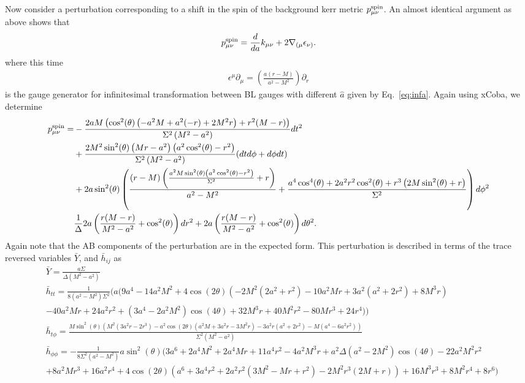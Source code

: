 \documentclass[aps,prd,amsmath,showpacs,amssymb,superscriptaddress,nofootinbib,longbibliography,eqsecnum,preprintnumbers]{revtex4-1}
\begin{document}
Now consider a perturbation corresponding to a shift in the spin of the background kerr metric $p_{\mu\nu}^{\rm spin}$. An almost identical argument as above shows that 
\begin{align}
p_{\mu\nu}^{\rm spin}=\frac{d}{da}k_{\mu\nu}+2\nabla_{(\mu}\epsilon_{\nu)}.
\end{align}
where this time 
\begin{align}
\epsilon^\mu\partial_\mu=\left(\frac{a(r-M)}{a^2-M^2}\right)\partial_r
\end{align}
is the gauge generator for infinitesimal transformation between BL gauges with different $\hat a$ given by Eq.~\eqref{eq:infa}. Again using xCoba, we determine
\begin{align}
p_{\mu\nu}^{\rm spin}= 
&-\frac{2 a M \left(\cos ^2(\theta ) \left(-a^2 M+a^2 (-r)+2 M^2 r\right)+r^2 (M-r)\right)}{\Sigma ^2 \left(M^2-a^2\right)} dt^2 \nonumber \\
&+\frac{2 M^2 \sin ^2(\theta ) \left(M r-a^2\right) \left(a^2 \cos ^2(\theta )-r^2\right)}{\Sigma ^2 \left(M^2-a^2\right)}(dt d\phi+d\phi dt) \nonumber \\
&+2 a \sin ^2(\theta ) \left(\frac{(r-M) \left(\frac{a^2 M \sin ^2(\theta ) \left(a^2 \cos ^2(\theta )-r^2\right)}{\Sigma ^2}+r\right)}{a^2-M^2}+\frac{a^4 \cos ^4(\theta )+2 a^2 r^2 \cos ^2(\theta )+r^3 \left(2 M \sin ^2(\theta )+r\right)}{\Sigma ^2}\right) d\phi^2 \nonumber \\
&\frac{1}{\Delta}2 a \left(\frac{r (M-r)}{M^2-a^2}+\cos ^2(\theta )\right)dr^2+ 2 a \left(\frac{r (M-r)}{M^2-a^2}+\cos ^2(\theta )\right)d\theta^2.
\end{align}
Again note that the AB components of the perturbation are in the expected form. This perturbation is described in terms of the trace reversed variables $\bar Y$, and $\bar h_{ij}$ as
\begin{align}
&\bar Y =\frac{a\Sigma}{\Delta(M^2-a^2)} \nonumber \\
&\bar h_{tt}=\frac{1}{8 (a^2 - M^2)\Sigma^2}(a (9 a^4-14 a^2 M^2+4 \cos (2 \theta ) \left(-2 M^2 \left(2 a^2+r^2\right)-10 a^2 M r+3 a^2 \left(a^2+2 r^2\right)+8 M^3 r\right)
\nonumber \\
&-40 a^2 M r+24 a^2 r^2+\left(3 a^4-2 a^2 M^2\right) \cos (4 \theta )+32 M^3 r+40 M^2 r^2-80 M r^3+24 r^4)) \nonumber \\
&\bar h_{t\phi}=\frac{M \sin ^2(\theta ) \left(M^2 \left(3 a^2 r-2 r^3\right)-a^2 \cos (2 \theta ) \left(a^2 M+3 a^2 r-3 M^2 r\right)-3 a^2 r \left(a^2+2 r^2\right)-M \left(a^4-6 a^2 r^2\right)\right)}{\Sigma ^2 \left(M^2-a^2\right)} \nonumber \\
& \bar h_{\phi\phi} =-\frac{1}{8 \Sigma ^2 \left(a^2-M^2\right)}
a \sin ^2(\theta ) (3 a^6+2 a^4 M^2+2 a^4 M r+11 a^4 r^2-4 a^2 M^3 r
+a^2 \Delta  \left(a^2-2 M^2\right) \cos (4 \theta )-22 a^2 M^2 r^2
\nonumber \\
&+8 a^2 M r^3+16 a^2 r^4
+4 \cos (2 \theta ) \left(a^6+3 a^4 r^2+2 a^2 r^2 \left(3 M^2-M r+r^2\right)-2 M^2 r^3 (2 M+r)\right)+16 M^3 r^3+8 M^2 r^4+8 r^6)
\end{align}
\end{document}
